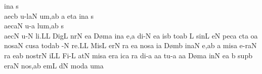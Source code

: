 \spatium
\sgn {}in\punctum a\egn
\spatium
\sgn s{\\ae}c\punctum b\egn
\sgn {}u{-l}\clivis aN\egn
\sgn {}u{m,}\punctum a\augmentum b\egn
\spatium
\divisiominor
\spatium
\custos a
\lineaproxima
\sgn {}et\punctum a\egn
\spatium
\sgn {}in\punctum a\egn
\spatium
\sgn s{\\ae}c\clivis aN\egn
\sgn {}u-\punctum a\egn
\sgn lu{m,}\pes ab\egn
\spatium
\sgn s{\\ae}c\punctum N\egn
\sgn {}u-\punctum N\egn
\sgn li.\punctum L\augmentum L\egn
\spatium
\divisiofinalis
\spatium
\sgn Dig\punctum L\egn
\sgn n{\a}r\punctum N\egn
\sgn {}e{}\punctum a\egn
\spatium
\sgn D{\o}m\punctum a\egn
\sgn {}in\punctum a\egn
\sgn {}e,\punctum a\egn
\spatium
\sgn di-\punctum N\egn
\sgn {}e{}\punctum a\egn
\spatium
\sgn {}is\punctum b\egn
\sgn to{}\punctum a\augmentum b\egn
\spatium
\divisiominor
\spatium
\custos L
\lineaproxima
\sgn sin\punctum L\egn
\sgn {}e{}\punctum N\egn
\spatium
\sgn pec\punctum a\egn
\sgn c{\a}t\punctum a\egn
\sgn {}o{}\punctum a\egn
\spatium
\sgn nos\clivis aN\egn
\spatium
\sgn cus\punctum a\egn
\sgn tod\pes ab\egn
\sgn {}{\\i}-\bivirga N\egn
\sgn re.\punctum L\augmentum L\egn
\spatium
\divisiofinalis
\spatium
\sgn Mis\punctum L\egn
\sgn {}er\punctum N\egn
\sgn {}{\e}r\punctum a\egn
\sgn {}e{}\punctum a\egn
\spatium
\sgn nos\punctum a\egn
{}i{}\punctum a\egn
\spatium
\sgn D{\o}m\punctum b\egn
\sgn {}in\clivis aN\egn
\sgn {}e,\punctum a\augmentum b\egn
\spatium
\divisiominor
\spatium
\custos a
\lineaproxima
\sgn mis\punctum a\egn
\sgn {}e{-r}\clivis aN\egn
\sgn {}{\e}r\punctum a\egn
\sgn {}e{}\pes ab\egn
\spatium
\sgn no{str}\bivirga N\egn
\sgn {}i{}\punctum L\augmentum L\egn
\spatium
\divisiofinalis
\spatium
\sgn Fi-\punctum L\egn
\sgn {}at\punctum N\egn
\spatium
\sgn mis\punctum a\egn
\sgn {}er\punctum a\egn
\sgn {}ic\punctum a\egn
\sgn {}{\o}r\punctum a\egn
\sgn di-\punctum a\egn
\sgn {}a{}\punctum a\egn
\spatium
\sgn tu-\punctum a\egn
\sgn {}a{}\punctum a\egn
\spatium
\sgn D{\o}m\punctum a\egn
\sgn {}in\punctum N\egn
\sgn {}e{}\punctum a\egn
\spatium
\custos b
\lineaproxima
\sgn sup\punctum b\egn
\sgn {}er\clivis aN\egn
\spatium
\sgn no{s,}\punctum a\augmentum b\egn
\spatium
\divisiominor
\spatium
{}em\punctum L\egn
\sgn {}{\a}d\punctum N\egn
\sgn mod\punctum a\egn
\sgn {}um\punctum a\egn
\spatium
